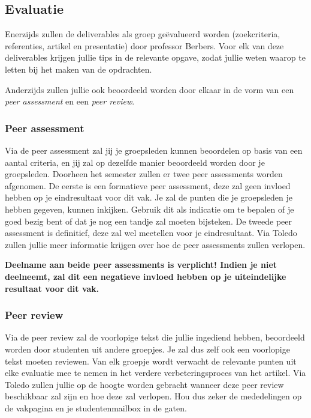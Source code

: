 \documentclass[a4paper]{article}
\begin{document}
\subsection{Evaluatie}

Enerzijds zullen de deliverables als groep ge\"evalueerd worden (zoekcriteria, referenties, artikel en presentatie) door professor Berbers.
Voor elk van deze deliverables krijgen jullie tips in de relevante opgave, zodat jullie weten waarop te letten bij het maken van de opdrachten.

Anderzijds zullen jullie ook beoordeeld worden door elkaar in de vorm van een \textit{peer assessment} en een \textit{peer review}.

\subsubsection{Peer assessment}

Via de peer assessment zal jij je groepsleden kunnen beoordelen op basis van een aantal criteria, en jij zal op dezelfde manier beoordeeld worden door je groepsleden.
Doorheen het semester zullen er twee peer assessments worden afgenomen.
De eerste is een formatieve peer assessment, deze zal geen invloed hebben op je eindresultaat voor dit vak.
Je zal de punten die je groepsleden je hebben gegeven, kunnen inkijken.
Gebruik dit als indicatie om te bepalen of je goed bezig bent of dat je nog een tandje zal moeten bijsteken.
De tweede peer assessment is definitief, deze zal wel meetellen voor je eindresultaat.
Via Toledo zullen jullie meer informatie krijgen over hoe de peer assessments zullen verlopen.

\textbf{
	Deelname aan beide peer assessments is verplicht!
	Indien je niet deelneemt, zal dit een negatieve invloed hebben op je uiteindelijke resultaat voor dit vak.
}


\subsubsection{Peer review}

Via de peer review zal de voorlopige tekst die jullie ingediend hebben, beoordeeld worden door studenten uit andere groepjes.
Je zal dus zelf ook een voorlopige tekst moeten reviewen.
Van elk groepje wordt verwacht de relevante punten uit elke evaluatie mee te nemen in het verdere verbeteringsproces van het artikel.
Via Toledo zullen jullie op de hoogte worden gebracht wanneer deze peer review beschikbaar zal zijn en hoe deze zal verlopen.
Hou dus zeker de mededelingen op de vakpagina en je studentenmailbox in de gaten.
\end{document}
